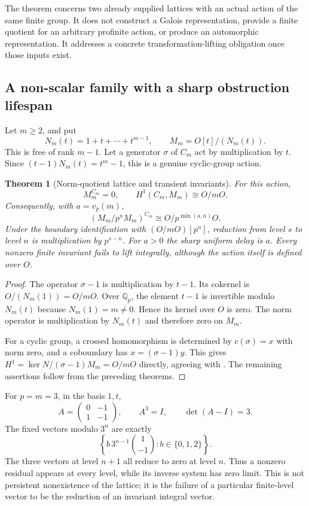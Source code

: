 \documentclass[11pt]{article}
\newtheorem{theorem}{Theorem}[section]
\theoremstyle{definition}
\theoremstyle{remark}
\begin{document}
The theorem concerns two already supplied lattices with an actual action of the same finite group. It does not construct a Galois representation, provide a finite quotient for an arbitrary profinite action, or produce an automorphic representation. It addresses a concrete transformation-lifting obligation once those inputs exist.

\subsection{A non-scalar family with a sharp obstruction lifespan}

Let $m\geq2$, and put
\[
 N_m(t)=1+t+\cdots+t^{m-1},\qquad
 M_m=O[t]/(N_m(t)).
\]
This is free of rank $m-1$. Let a generator $\sigma$ of $C_m$ act by multiplication by $t$. Since $(t-1)N_m(t)=t^m-1$, this is a genuine cyclic-group action.

\begin{theorem}[Norm-quotient lattice and transient invariants]\label{thm:norm-quotient}
For this action,
\[
 M_m^{C_m}=0,\qquad
 H^1(C_m,M_m)\cong O/mO.
\]
Consequently, with $a=v_p(m)$,
\[
 (M_m/p^nM_m)^{C_m}\cong O/p^{\min(a,n)}O.
\]
Under the boundary identification with $(O/mO)[p^n]$, reduction from level $s$ to level $n$ is multiplication by $p^{s-n}$. For $a>0$ the sharp uniform delay is $a$. Every nonzero finite invariant fails to lift integrally, although the action itself is defined over $O$.
\end{theorem}
\begin{proof}
The operator $\sigma-1$ is multiplication by $t-1$. Its cokernel is $O/(N_m(1))=O/mO$. Over $\mathbb Q_p$, the element $t-1$ is invertible modulo $N_m(t)$ because $N_m(1)=m\ne0$. Hence its kernel over $O$ is zero. The norm operator is multiplication by $N_m(t)$ and therefore zero on $M_m$.

For a cyclic group, a crossed homomorphism is determined by $c(\sigma)=x$ with norm zero, and a coboundary has $x=(\sigma-1)y$. This gives $H^1=\ker N/(\sigma-1)M_m=O/mO$ directly, agreeing with \cite[Chapter II, 1.20]{MilneCFT2020}. The remaining assertions follow from the preceding theorems.
\end{proof}

For $p=m=3$, in the basis $1,t$,
\[
 A=\begin{pmatrix}0&-1\\1&-1\end{pmatrix},\qquad
 A^3=I,\qquad \det(A-I)=3.
\]
The fixed vectors modulo $3^n$ are exactly
\[
 \left\{b\,3^{n-1}\binom{1}{-1}:b\in\{0,1,2\}\right\}.
\]
The three vectors at level $n+1$ all reduce to zero at level $n$. Thus a nonzero residual appears at every level, while its inverse system has zero limit. This is not persistent nonexistence of the lattice; it is the failure of a particular finite-level vector to be the reduction of an invariant integral vector.
\end{document}
